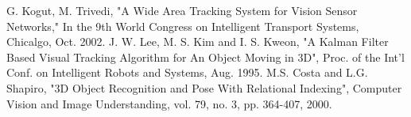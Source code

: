 \begin{thebibliography}{200}
 G. Kogut, M. Trivedi, "A Wide Area Tracking System for Vision Sensor Networks," In the 9th World Congress on Intelligent Transport Systems, Chicalgo, Oct. 2002.
 J. W. Lee, M. S. Kim and I. S. Kweon, "A Kalman Filter Based Visual Tracking Algorithm for An Object Moving in 3D", Proc. of the Int'l Conf. on Intelligent Robots and Systems, Aug. 1995.
M.S. Costa and L.G. Shapiro, "3D Object Recognition and Pose With Relational Indexing", Computer Vision and Image Understanding, vol. 79, no. 3, pp. 364-407, 2000.
\end{thebibliography}
